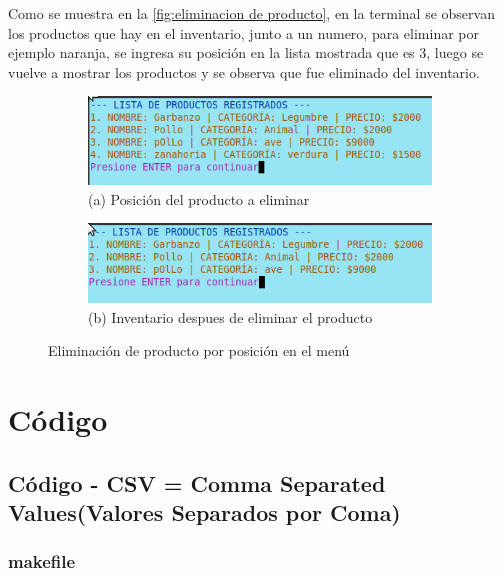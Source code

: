 \documentclass[12pt]{article}
\begin{document}
Como se muestra en la \autoref{fig:eliminacion de producto}, en la terminal se observan los productos que hay en el inventario, junto a un numero, para eliminar por ejemplo naranja, se ingresa su posición en la lista mostrada que es $3$, luego se vuelve a mostrar los productos y se observa que fue eliminado del inventario.
\begin{figure}[H]
    \centering

    \begin{subfigure}[b]{0.6\textwidth}
        \centering
        \includegraphics[width=\textwidth]{Imagenes/pre_eliminacion.png}
        \caption*{(a) Posición del producto a eliminar}
    \end{subfigure}
    \hfill
    \begin{subfigure}[b]{0.6\textwidth}
        \centering
        \includegraphics[width=\textwidth]{Imagenes/post_eliminacion.png}
        \caption*{(b) Inventario despues de eliminar el producto}
    \end{subfigure}

    \caption{Eliminación de producto por posición en el menú}
    \label{fig:eliminacion de producto}
\end{figure}


\section{Código}
\subsection{Código - CSV = Comma Separated Values(Valores Separados por Coma)}

\subsubsection{makefile}
\inputminted[fontsize=\small]{make}{CodigoCSV/makefile}
\end{document}
